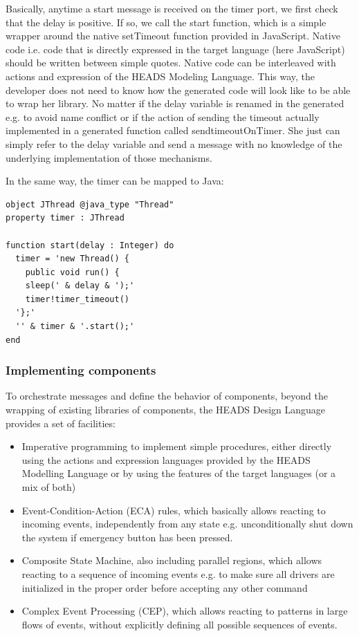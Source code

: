 Basically, anytime a start message is received on the timer port, we first check that the delay is positive. If so, we call the start function, which is a simple wrapper around the native setTimeout function provided in JavaScript. Native code i.e. code that is directly expressed in the target language (here JavaScript) should be written between simple quotes. Native code can be interleaved with actions and expression of the HEADS Modeling Language. This way, the developer does not need to know how the generated code will look like to be able to wrap her library. No matter if the delay variable is renamed in the generated e.g. to avoid name conflict or if the action of sending the timeout actually implemented in a generated function called sendtimeoutOnTimer. She just can simply refer to the delay variable and send a message with no knowledge of the underlying implementation of those mechanisms. 

In the same way, the timer can be mapped to Java:

\begin{lstlisting}
object JThread @java_type "Thread" 
property timer : JThread 

function start(delay : Integer) do  
  timer = 'new Thread() { 
    public void run() { 
    sleep(' & delay & ');' 
    timer!timer_timeout() 
  '};' 
  '' & timer & '.start();' 
end 
\end{lstlisting} 

\subsubsection{Implementing components}

To orchestrate messages and define the behavior of components, beyond the wrapping of existing libraries of components, the HEADS Design Language provides a set of facilities: 
\begin{itemize}
\item Imperative programming to implement simple procedures, either directly using the actions and expression languages provided by the HEADS Modelling Language or by using the features of the target languages (or a mix of both) 
\item Event-Condition-Action (ECA) rules, which basically allows reacting to incoming events, independently from any state e.g. unconditionally shut down the system if emergency button has been pressed.  
\item Composite State Machine, also including parallel regions, which allows reacting to a sequence of incoming events e.g. to make sure all drivers are initialized in the proper order before accepting any other command 
\item Complex Event Processing (CEP), which allows reacting to patterns in large flows of events, without explicitly defining all possible sequences of events.
	\end{itemize}

